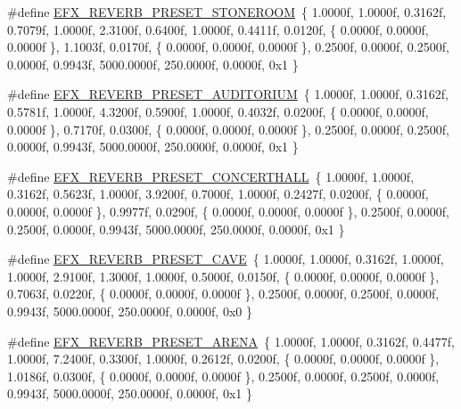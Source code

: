 \begin{DoxyCompactItemize}
\item 
\#define \mbox{\hyperlink{efx-presets_8h_a0e1d69fafcc43e8837a8e4270665a0ae}{E\+F\+X\+\_\+\+R\+E\+V\+E\+R\+B\+\_\+\+P\+R\+E\+S\+E\+T\+\_\+\+S\+T\+O\+N\+E\+R\+O\+OM}}~\{ 1.\+0000f, 1.\+0000f, 0.\+3162f, 0.\+7079f, 1.\+0000f, 2.\+3100f, 0.\+6400f, 1.\+0000f, 0.\+4411f, 0.\+0120f, \{ 0.\+0000f, 0.\+0000f, 0.\+0000f \}, 1.\+1003f, 0.\+0170f, \{ 0.\+0000f, 0.\+0000f, 0.\+0000f \}, 0.\+2500f, 0.\+0000f, 0.\+2500f, 0.\+0000f, 0.\+9943f, 5000.\+0000f, 250.\+0000f, 0.\+0000f, 0x1 \}
\item 
\#define \mbox{\hyperlink{efx-presets_8h_a1868444b35b1d09cc8438f66cb4ce7a8}{E\+F\+X\+\_\+\+R\+E\+V\+E\+R\+B\+\_\+\+P\+R\+E\+S\+E\+T\+\_\+\+A\+U\+D\+I\+T\+O\+R\+I\+UM}}~\{ 1.\+0000f, 1.\+0000f, 0.\+3162f, 0.\+5781f, 1.\+0000f, 4.\+3200f, 0.\+5900f, 1.\+0000f, 0.\+4032f, 0.\+0200f, \{ 0.\+0000f, 0.\+0000f, 0.\+0000f \}, 0.\+7170f, 0.\+0300f, \{ 0.\+0000f, 0.\+0000f, 0.\+0000f \}, 0.\+2500f, 0.\+0000f, 0.\+2500f, 0.\+0000f, 0.\+9943f, 5000.\+0000f, 250.\+0000f, 0.\+0000f, 0x1 \}
\item 
\#define \mbox{\hyperlink{efx-presets_8h_a56733ee2e8ebe8ef49edcae1a9d5285f}{E\+F\+X\+\_\+\+R\+E\+V\+E\+R\+B\+\_\+\+P\+R\+E\+S\+E\+T\+\_\+\+C\+O\+N\+C\+E\+R\+T\+H\+A\+LL}}~\{ 1.\+0000f, 1.\+0000f, 0.\+3162f, 0.\+5623f, 1.\+0000f, 3.\+9200f, 0.\+7000f, 1.\+0000f, 0.\+2427f, 0.\+0200f, \{ 0.\+0000f, 0.\+0000f, 0.\+0000f \}, 0.\+9977f, 0.\+0290f, \{ 0.\+0000f, 0.\+0000f, 0.\+0000f \}, 0.\+2500f, 0.\+0000f, 0.\+2500f, 0.\+0000f, 0.\+9943f, 5000.\+0000f, 250.\+0000f, 0.\+0000f, 0x1 \}
\item 
\#define \mbox{\hyperlink{efx-presets_8h_a0ca71faa4923155557a0b9a8c5227775}{E\+F\+X\+\_\+\+R\+E\+V\+E\+R\+B\+\_\+\+P\+R\+E\+S\+E\+T\+\_\+\+C\+A\+VE}}~\{ 1.\+0000f, 1.\+0000f, 0.\+3162f, 1.\+0000f, 1.\+0000f, 2.\+9100f, 1.\+3000f, 1.\+0000f, 0.\+5000f, 0.\+0150f, \{ 0.\+0000f, 0.\+0000f, 0.\+0000f \}, 0.\+7063f, 0.\+0220f, \{ 0.\+0000f, 0.\+0000f, 0.\+0000f \}, 0.\+2500f, 0.\+0000f, 0.\+2500f, 0.\+0000f, 0.\+9943f, 5000.\+0000f, 250.\+0000f, 0.\+0000f, 0x0 \}
\item 
\#define \mbox{\hyperlink{efx-presets_8h_a80a8de17793714c91369357ba370843d}{E\+F\+X\+\_\+\+R\+E\+V\+E\+R\+B\+\_\+\+P\+R\+E\+S\+E\+T\+\_\+\+A\+R\+E\+NA}}~\{ 1.\+0000f, 1.\+0000f, 0.\+3162f, 0.\+4477f, 1.\+0000f, 7.\+2400f, 0.\+3300f, 1.\+0000f, 0.\+2612f, 0.\+0200f, \{ 0.\+0000f, 0.\+0000f, 0.\+0000f \}, 1.\+0186f, 0.\+0300f, \{ 0.\+0000f, 0.\+0000f, 0.\+0000f \}, 0.\+2500f, 0.\+0000f, 0.\+2500f, 0.\+0000f, 0.\+9943f, 5000.\+0000f, 250.\+0000f, 0.\+0000f, 0x1 \}

\end{DoxyCompactItemize}
